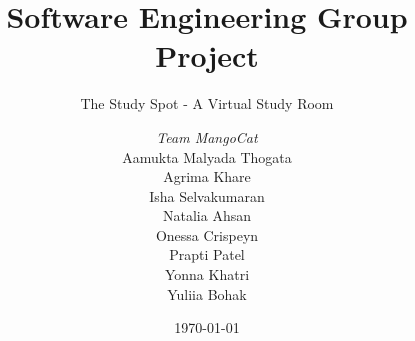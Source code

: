 \documentclass[a4paper, 12pt]{report}
\title{Software Engineering Group Project}
\subtitle{The Study Spot - A Virtual Study Room}%
\author{\textit{Team MangoCat}\\   %
Aamukta Malyada Thogata\\                        %
Agrima Khare\\                        %
Isha Selvakumaran\\                      %
Natalia Ahsan\\                       %
Onessa Crispeyn\\                       %
Prapti Patel\\                        %
Yonna Khatri\\                      %
Yuliia Bohak\\                      %
}
\date{\today}
\begin{document}
    \maketitle
    \romantableofcontents

    
    
    
    
    
    

    \appendix
\end{document}
